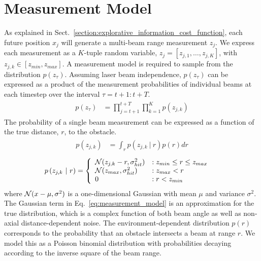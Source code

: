 \section{Measurement Model}
\label{sec:measurement_model}

As explained in Sect.~\ref{section:explorative_information_cost_function}, each future position $x_{j}$ will generate a multi-beam range measurement $z_{j}$. We express each measurement as a $K$-tuple random variable, $z_{j} = \left[z_{j, 1}, \dots, z_{j, K}\right]$, with $z_{j, k} \in \left[z_{min}, z_{max}\right]$. A measurement model is required to sample from the distribution $p(z_{\tau})$. Assuming laser beam independence, $p(z_{\tau})$ can be expressed as a product of the measurement probabilities of individual beams at each timestep over the interval $\tau = t+1:t+T$.
%
\begin{align}
  \begin{split}
    p
    \left(
    z_{\tau}
    \right)
    &=
    \prod_{j=t+1}^{t+T}
    \prod_{k=1}^{K}
    p
    \left(
    z_{j, k}
    \right)
  \end{split}
\end{align}
%
The probability of a single beam measurement can be expressed as a function of the true distance, $r$, to the obstacle.
%
\begin{align}
  \begin{split}
    p
    \left(
    z_{j, k}
    \right)
    &=
    \int_{r}
    p
    \left(
    z_{j, k}
    \ \vert \
    r
    \right)
    p
    \left(
    r
    \right)
    dr
  \end{split}
\end{align}
%
\begin{align}
  \begin{split}
    p
    \left(
    z_{j, k}
    \ \vert \
    r
    \right)
    &=
    \left\{
    \begin{array}{ll}
      \mathcal{N}(z_{j, k} - r, \sigma_{hit}^{2}) &: z_{min} \le r \le z_{max} \\
            \mathcal{N}(z_{max}, \sigma_{hit}^{2}) &: z_{max} < r \\
                                            0 &: r < z_{min}
    \end{array}
    \right.
    \label{eq:measurement_model}
  \end{split}
\end{align}
%
where $\mathcal{N}(x - \mu, \sigma^{2})$ is a one-dimensional Gaussian with mean $\mu$ and variance $\sigma^{2}$. The Gaussian term in Eq.~\eqref{eq:measurement_model} is an approximation for the true distribution, which is a complex function of both beam angle as well as non-axial distance-dependent noise. The environment-dependent distribution $p(r)$ corresponds to the probability that an obstacle intersects a beam at range $r$. We model this as a Poisson binomial distribution with probabilities decaying according to the inverse square of the beam range.

